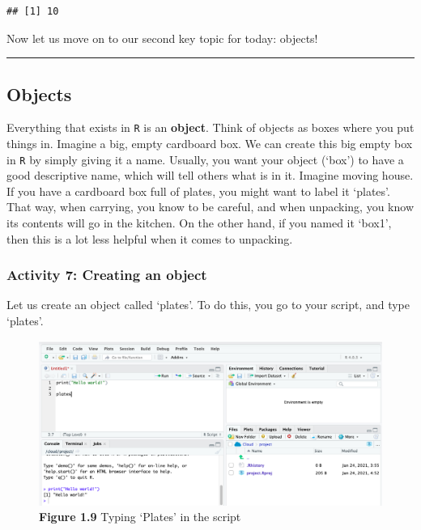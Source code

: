 \documentclass[
]{book}
\begin{document}
\begin{verbatim}
## [1] 10
\end{verbatim}

Now let us move on to our second key topic for today: objects!

\begin{center}\rule{0.5\linewidth}{0.5pt}\end{center}

\hypertarget{objects}{%
\subsection{Objects}\label{objects}}

Everything that exists in \texttt{R} is an \textbf{object}. Think of objects as boxes where you put things in. Imagine a big, empty cardboard box. We can create this big empty box in \texttt{R} by simply giving it a name. Usually, you want your object (`box') to have a good descriptive name, which will tell others what is in it. Imagine moving house. If you have a cardboard box full of plates, you might want to label it `plates'. That way, when carrying, you know to be careful, and when unpacking, you know its contents will go in the kitchen. On the other hand, if you named it `box1', then this is a lot less helpful when it comes to unpacking.

\hypertarget{activity-7-creating-an-object}{%
\subsubsection{Activity 7: Creating an object}\label{activity-7-creating-an-object}}

Let us create an object called `plates'. To do this, you go to your script, and type `plates'.

\begin{figure}
\centering
\includegraphics{Images/plates.png}
\caption{\textbf{Figure 1.9} Typing `Plates' in the script}
\end{figure}
\end{document}
